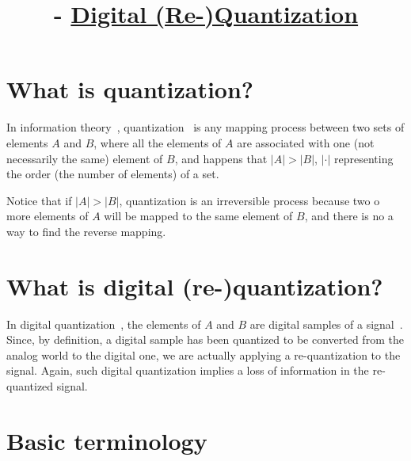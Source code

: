 



\title{\SM{} - \href{https://github.com/Sistemas-Multimedia/Sistemas-Multimedia.github.io/tree/master/contents/quantization}{Digital (Re-)Quantization}}

\maketitle

\tableofcontents

\section{What is quantization?}

In information theory~\cite{vruiz__information_theory},
quantization~\cite{vruiz__signal_quantization,vruiz__scalar_quantization,vruiz__vector_quantization,vruiz__trellis_quantization}
is any mapping process between two sets of elements $A$ and $B$, where
all the elements of $A$ are associated with one (not necessarily the
same) element of $B$, and happens that $|A|>|B|$, $|\cdot|$
representing the order (the number of elements) of a set.

Notice that if $|A|>|B|$, quantization is an irreversible process
because two o more elements of $A$ will be mapped to the same element
of $B$, and there is no a way to find the reverse mapping.

\section{What is digital (re-)quantization?}

In digital
quantization~\cite{vruiz__scalar_quantization,vruiz__vector_quantization},
the elements of $A$ and $B$ are digital samples of a
signal~\cite{vruiz__signal_quantization}. Since, by definition, a
digital sample has been quantized to be converted from the analog
world to the digital one, we are actually applying a re-quantization
to the signal. Again, such digital quantization implies a loss of
information in the re-quantized signal.

\section{Basic terminology}

